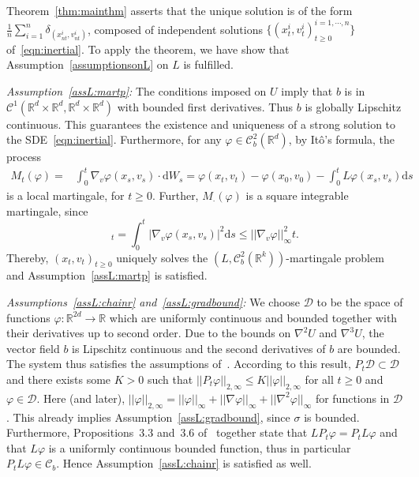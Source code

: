 \documentclass{article}
\newcommand{\dd}{\text{d}}
\newcommand{\R}{\mathbb{R}}
\newcommand{\C}{\mathcal C}
\begin{document}
Theorem~\ref{thm:mainthm} asserts that the unique solution is of the form
$\frac 1 n \sum_{i=1}^n\delta_{(x_{n t}^i,v_{ n t}^i)}$, composed of independent solutions
$\{(x_t^i,v_t^i)_{t \geq 0}^{i=1,\cdots, n}\}$ of~\eqref{eqn:inertial}. To apply the theorem, we have show
that Assumption~\ref{assumptionsonL} on $L$ is fulfilled.

\emph{Assumption~\ref{assL:martp}:} The conditions imposed on $U$ imply that $b$ is in
$\C^1(\R^d \times \R^d, \R^d \times \R^d)$ with bounded first derivatives. Thus $b$ is globally Lipschitz
continuous. This guarantees the existence and uniqueness of a strong solution to the
SDE~\eqref{eqn:inertial}. Furthermore, for any $\varphi \in \C^2_b(\R^{d})$, by It\^o's formula, the process
\begin{align*}
  M_t (\varphi) =& \int_0^t \nabla_v \varphi(x_s, v_s) \cdot \dd W_s
                =\varphi(x_t,v_t) - \varphi(x_0,v_0) - \int_0^t L\varphi(x_s,v_s) \dd s 
\end{align*}
is a local martingale, for $t\geq 0$. Further, $M_\cdot(\varphi)$ is a square integrable martingale, since
\begin{equation*}
  [M_\cdot(\varphi)]_t = \int_0^t |\nabla_v \varphi(x_s, v_s)|^2 \dd s \leq ||\nabla_v
  \varphi||_\infty^2 t .
\end{equation*}
Thereby, $(x_t,v_t)_{t \geq 0}$ uniquely solves the $(L, \C^2_b(\R^k))$-martingale problem and
Assumption~\ref{assL:martp} is satisfied.

\smallskip

\emph{Assumptions~\ref{assL:chainr} and~\ref{assL:gradbound}:} We choose $\mathcal{D}$ to be the space of
functions $\varphi\colon \R^{2d} \to \R$ which are uniformly continuous and bounded together with their
derivatives up to second order.  Due to the bounds on $\nabla^2 U$ and $\nabla^3 U$, the vector field $b$ is
Lipschitz continuous and the second derivatives of $b$ are bounded. The system thus satisfies the assumptions
of~\cite[Proposition~2.5]{Da-Prato2011a}. According to this result, $P_t \mathcal D \subset \mathcal D$ and
there exists some $K > 0$ such that $||P_t \varphi||_{2, \infty} \leq K||\varphi||_{2,\infty}$ for all
$t \geq 0$ and $\varphi \in \mathcal D$.  Here (and later),
$||\varphi||_{2,\infty} = ||\varphi||_\infty + ||\nabla \varphi||_\infty + ||\nabla^2 \varphi||_\infty$ for
functions in $\mathcal D$.  This already implies Assumption~\ref{assL:gradbound}, since $\sigma$ is bounded.
Furthermore, Propositions~3.3 and~3.6 of~\cite{Da-Prato2011a} together state that
$L P_t \varphi = P_tL \varphi$ and that $L \varphi$ is a uniformly continuous bounded function, thus in
particular $P_t L \varphi \in \C_b$. Hence Assumption~\ref{assL:chainr} is satisfied as well.
\end{document}
